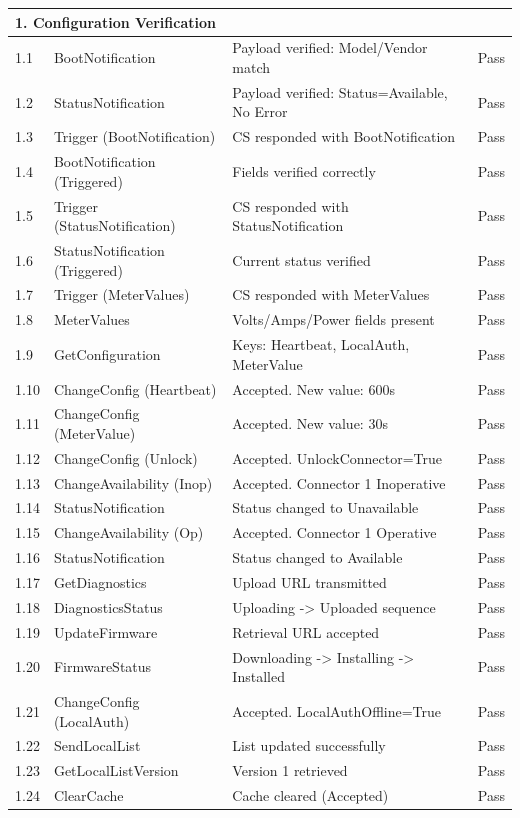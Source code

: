 \documentclass[a4paper,11pt]{report}
\begin{document}
\begin{footnotesize}
\begin{footnotesize}
\begin{longtable}{|p{1.0cm}|p{4.5cm}|p{6.5cm}|c|}
\multicolumn{4}{|l|}{\textbf{1. Configuration Verification}} \\
\hline
1.1 & BootNotification & Payload verified: Model/Vendor match & Pass \\
\hline
1.2 & StatusNotification & Payload verified: Status=Available, No Error & Pass \\
\hline
1.3 & Trigger (BootNotification) & CS responded with BootNotification & Pass \\
\hline
1.4 & BootNotification (Triggered) & Fields verified correctly & Pass \\
\hline
1.5 & Trigger (StatusNotification) & CS responded with StatusNotification & Pass \\
\hline
1.6 & StatusNotification (Triggered) & Current status verified & Pass \\
\hline
1.7 & Trigger (MeterValues) & CS responded with MeterValues & Pass \\
\hline
1.8 & MeterValues & Volts/Amps/Power fields present & Pass \\
\hline
1.9 & GetConfiguration & Keys: Heartbeat, LocalAuth, MeterValue & Pass \\
\hline
1.10 & ChangeConfig (Heartbeat) & Accepted. New value: 600s & Pass \\
\hline
1.11 & ChangeConfig (MeterValue) & Accepted. New value: 30s & Pass \\
\hline
1.12 & ChangeConfig (Unlock) & Accepted. UnlockConnector=True & Pass \\
\hline
1.13 & ChangeAvailability (Inop) & Accepted. Connector 1 Inoperative & Pass \\
\hline
1.14 & StatusNotification & Status changed to Unavailable & Pass \\
\hline
1.15 & ChangeAvailability (Op) & Accepted. Connector 1 Operative & Pass \\
\hline
1.16 & StatusNotification & Status changed to Available & Pass \\
\hline
1.17 & GetDiagnostics & Upload URL transmitted & Pass \\
\hline
1.18 & DiagnosticsStatus & Uploading -> Uploaded sequence & Pass \\
\hline
1.19 & UpdateFirmware & Retrieval URL accepted & Pass \\
\hline
1.20 & FirmwareStatus & Downloading -> Installing -> Installed & Pass \\
\hline
1.21 & ChangeConfig (LocalAuth) & Accepted. LocalAuthOffline=True & Pass \\
\hline
1.22 & SendLocalList & List updated successfully & Pass \\
\hline
1.23 & GetLocalListVersion & Version 1 retrieved & Pass \\
\hline
1.24 & ClearCache & Cache cleared (Accepted) & Pass \\
\hline


\end{longtable}
\end{footnotesize}
\end{footnotesize}
\end{document}

